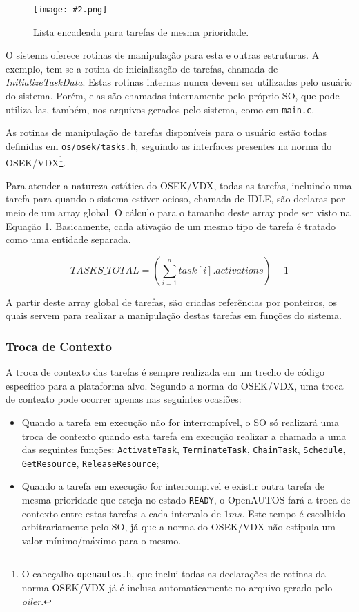 \documentclass[conference,compsoc]{IEEEtran}
\newcommand{\figura}[5][Extraido de:]{
	\begin{figure}[h!tb]
		\centering
		\caption{#3.}
		\texttt{[image: \#2.png]}
		\ifthenelse{\isempty{#5}}{}{%
			\\ #1 \cite{#5}.
		}	
		\label{fig:#2}
	\end{figure}
}
\begin{document}
\figura{cap4_task_next}{Lista encadeada para tarefas de mesma prioridade}{7cm}{}

O sistema oferece rotinas de manipulação para esta e outras estruturas. A exemplo, tem-se a rotina de inicialização de tarefas, chamada de \emph{InitializeTaskData}. Estas rotinas internas nunca devem ser utilizadas pelo usuário do sistema. Porém, elas são chamadas internamente pelo próprio SO, que pode utiliza-las, também, nos arquivos gerados pelo sistema, como em \texttt{main.c}.

As rotinas de manipulação de tarefas disponíveis para o usuário estão todas definidas em \texttt{os/osek/tasks.h}, seguindo as interfaces presentes na norma do OSEK/VDX\footnote{O cabeçalho \texttt{openautos.h}, que inclui todas as declarações de rotinas da norma OSEK/VDX já é inclusa automaticamente no arquivo gerado pelo \emph{oiler}.}.

Para atender a natureza estática do OSEK/VDX, todas as tarefas, incluindo uma tarefa para quando o sistema estiver ocioso, chamada de IDLE, são declaras por meio de um array global. O cálculo para o tamanho deste array pode ser visto na Equação 1. Basicamente, cada ativação de um mesmo tipo de tarefa é tratado como uma entidade separada.

\begin{equation}
	\label{equ:cap4_tasks_total}
	TASKS\_TOTAL = (\sum\limits_{i=1}^{n} task[i].activations) + 1
\end{equation}

A partir deste array global de tarefas, são criadas referências por ponteiros, os quais servem para realizar a manipulação destas tarefas em funções do sistema.

\subsubsection{Troca de Contexto}

A troca de contexto das tarefas é sempre realizada em um trecho de código específico para a plataforma alvo. Segundo a norma do OSEK/VDX, uma troca de contexto pode ocorrer apenas nas seguintes ocasiões:

\begin{itemize}
	\item Quando a tarefa em execução não for interrompível, o SO só realizará uma troca de contexto quando esta tarefa em execução realizar a chamada a uma das seguintes funções: \texttt{ActivateTask}, \texttt{TerminateTask}, \texttt{ChainTask}, \texttt{Schedule}, \texttt{GetResource}, \texttt{ReleaseResource};
	\item Quando a tarefa em execução for interrompivel e existir outra tarefa de mesma prioridade que esteja no estado \texttt{READY}, o OpenAUTOS fará a troca de contexto entre estas tarefas a cada intervalo de $1ms$. Este tempo é escolhido arbitrariamente pelo SO, já que a norma do OSEK/VDX não estipula um valor mínimo/máximo para o mesmo.
\end{itemize}
\end{document}
